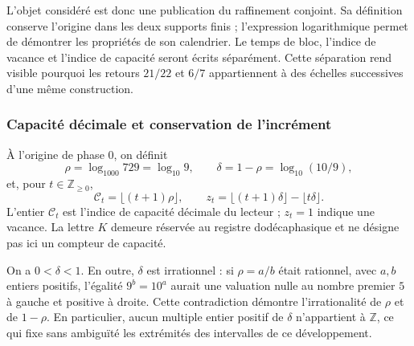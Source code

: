 L'objet considéré est donc une publication du raffinement conjoint. Sa définition conserve l'origine dans les deux supports finis ; l'expression logarithmique permet de démontrer les propriétés de son calendrier. Le temps de bloc, l'indice de vacance et l'indice de capacité seront écrits séparément. Cette séparation rend visible pourquoi les retours \(21/22\) et \(6/7\) appartiennent à des échelles successives d'une même construction.

\subsubsection{Capacité décimale et conservation de l'incrément}
\label{viii:vac-add-capacidad}

\begin{definition}
\label{viii:vac-add-definicion}
À l'origine de phase \(0\), on définit
\begin{equation}
 \rho=\log_{1000}729=\log_{10}9,
 \qquad \delta=1-\rho=\log_{10}(10/9),
 \label{viii:vac-add-densidad}
\end{equation}
et, pour \(t\in\mathbb Z_{\geq0}\),
\begin{equation}
 \mathcal C_t=\lfloor(t+1)\rho\rfloor,
 \qquad
 z_t=\lfloor(t+1)\delta\rfloor-\lfloor t\delta\rfloor.
 \label{viii:vac-add-indices}
\end{equation}
L'entier \(\mathcal C_t\) est l'indice de capacité décimale du lecteur ;
\(z_t=1\) indique une vacance. La lettre \(K\) demeure réservée au
registre dodécaphasique et ne désigne pas ici un compteur de capacité.
\end{definition}

On a \(0<\delta<1\). En outre, \(\delta\) est irrationnel : si \(\rho=a/b\) était rationnel, avec \(a,b\) entiers positifs, l'égalité \(9^b=10^a\) aurait une valuation nulle au nombre premier \(5\) à gauche et positive à droite. Cette contradiction démontre l'irrationalité de \(\rho\) et de \(1-\rho\). En particulier, aucun multiple entier positif de \(\delta\) n'appartient à \(\mathbb Z\), ce qui fixe sans ambiguïté les extrémités des intervalles de ce développement.

